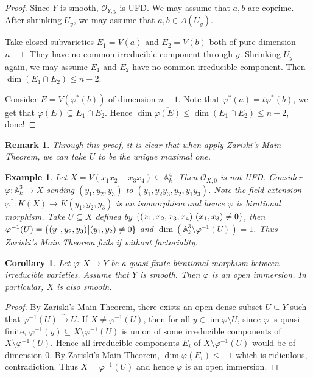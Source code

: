 \documentclass{ctexart}
\newtheorem{remark}{Remark}[section]
\newtheorem{example}{Example}[section]
\newtheorem{corollary}{Corollary}[section]
\newcommand{\im}{\operatorname{im}}
\begin{document}
\begin{proof}
    Since $Y$ is smooth, $\mathcal{O}_{Y, y}$ is UFD.
    We may assume that $a,b$ are coprime.
    After shrinking $U_{y}$, we may assume that $a,b\in A(U_{y})$.
    \par
    Take closed subvarieties $E_{1} = V(a)$ and $E_{2} = V(b)$ both of pure dimension $n - 1$.
    They have no common irreducible component through $y$.
    Shrinking $U_{y}$ again, we may assume $E_{1}$ and $E_{2}$ have no common irreducible component.
    Then $\dim (E_{1} \cap E_{2}) \le n - 2$.
    \par
    Consider $E = V(\varphi^{\ast}(b))$ of dimension $n - 1$.
    Note that $\varphi^{\ast}(a) = t\varphi^{\ast}(b)$, we get that $\varphi(E) \subseteq E_{1} \cap E_{2}$.
    Hence $\dim \overline{\varphi(E)} \le \dim (E_{1} \cap E_{2}) \le n - 2$, done!
\end{proof}
\begin{remark}
    Through this proof, it is clear that when apply Zariski's Main Theorem,
    we can take $U$ to be the unique maximal one.
\end{remark}
\begin{example}
    Let $X = V(x_{1}x_{2} - x_{3}x_{4}) \subseteq \mathbb{A}_{k}^{4}$.
    Then $\mathcal{O}_{X, 0}$ is not UFD.
    Consider $\varphi: \mathbb{A}_{k}^{3} \rightarrow X$ sending $(y_{1}, y_{2}, y_{3})$ to $(y_{1}, y_{2}y_{3}, y_{2}, y_{1}y_{3})$.
    Note the field extension $\varphi^{\ast}: K(X) \rightarrow K(y_{1}, y_{2}, y_{3})$ is an isomorphism and hence $\varphi$ is birational morphism.
    Take $U \subseteq X$ defined by $\{(x_{1}, x_{2}, x_{3}, x_{4}) \big{|} (x_{1}, x_{3}) \neq 0\}$,
    then $\varphi^{-1}(U) = \{(y_{1}, y_{2}, y_{3}) \big{|} (y_{1}, y_{2}) \neq 0\}$ and $\dim (\mathbb{A}_{k}^{3} \setminus \varphi^{-1}(U)) = 1$.
    Thus Zariski's Main Theorem fails if without factoriality.
\end{example}
\begin{corollary}
    Let $\varphi: X \rightarrow Y$ be a quasi-finite birational morphism between irreducible varieties.
    Assume that $Y$ is smooth.
    Then $\varphi$ is an open immersion.
    In particular, $X$ is also smooth.
    \label{Corollary 5.3}
\end{corollary}
\begin{proof}
    By Zariski's Main Theorem, there exists an open dense subset $U \subseteq Y$ such that $\varphi^{-1}(U) \overset{\sim}{\rightarrow} U$.
    If $X \neq \varphi^{-1}(U)$, then for all $y\in \im \varphi \setminus U$, 
    since $\varphi$ is quasi-finite, $\varphi^{-1}(y) \subseteq X \setminus \varphi^{-1}(U)$ is union of some irreducible components of $X \setminus \varphi^{-1}(U)$.
    Hence all irreducible components $E_{i}$ of $X \setminus \varphi^{-1}(U)$ would be of dimension $0$.
    By Zariski's Main Theorem, $\dim \overline{\varphi(E_{i})} \le -1$ which is ridiculous, contradiction.
    Thus $X = \varphi^{-1}(U)$ and hence $\varphi$ is an open immersion.
\end{proof}
\end{document}
